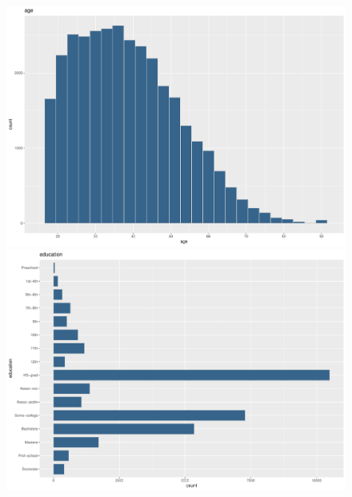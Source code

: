 \documentclass{scrartcl}[a4paper, 11pt]
\begin{document}
    \begin{figure}[H]
        \centering
        \begin{minipage}[b]{0.45\linewidth}
            \centering
            \includegraphics[width=\textwidth]{figures/age.pdf} 
        \end{minipage} 
        \begin{minipage}[b]{0.45\linewidth}
            \centering
            \includegraphics[width=\textwidth]{figures/education.pdf} 
        \end{minipage} 
        \begin{minipage}[b]{0.45\linewidth}
            \centering

\end{minipage}
\end{figure}
\end{document}
